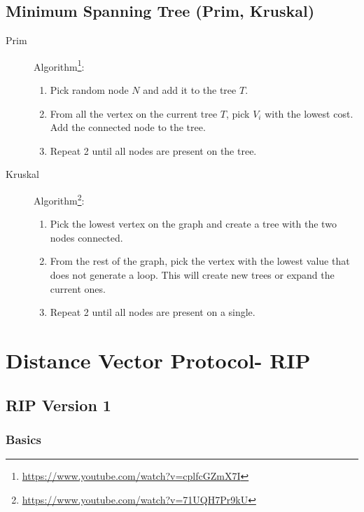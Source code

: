 \documentclass{article}
\begin{document}
\subsection{Minimum Spanning Tree (Prim, Kruskal)}

\begin{description}
   	\item[Prim] Algorithm\footnote{\url{https://www.youtube.com/watch?v=cplfcGZmX7I}}:
   	\begin{enumerate}
   		\item Pick random node $N$ and add it to the tree $T$.
   		\item From all the vertex on the current tree $T$, pick $V_{i}$ with the lowest cost. Add the connected node to the tree.
   		\item Repeat 2 until all nodes are present on the tree.
	\end{enumerate}
   	\item[Kruskal] Algorithm\footnote{\url{https://www.youtube.com/watch?v=71UQH7Pr9kU}}:
   	\begin{enumerate}
   		\item Pick the lowest vertex on the graph and create a tree with the two nodes connected.
   		\item From the rest of the graph, pick the vertex with the lowest value that does not generate a loop. This will create new trees or expand the current ones.
   		\item Repeat 2 until all nodes are present on a single.
	\end{enumerate}
\end{description}



\newpage




\section{Distance Vector Protocol- RIP}



\subsection{RIP Version 1}

\subsubsection{Basics}
\end{document}
